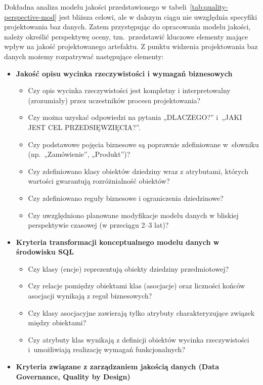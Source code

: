 Dokładna analiza modelu jakości przedstawionego w tabeli~\ref{tab:quality-perspective-mod} jest bliższa celowi, ale w dalszym ciągu nie uwzględnia specyfiki projektowania baz danych. Zatem przystępując do opracowania modelu jakości, należy określić perspektywę oceny, tzn.\ przedstawić kluczowe elementy mające wpływ na jakość projektowanego artefaktu. Z punktu widzenia projektowania baz danych możemy rozpatrywać następujące elementy:

\begin{itemize}
  \item \textbf{Jakość opisu wycinka rzeczywistości i wymagań biznesowych}
  \begin{itemize}
    \item Czy opis wycinka rzeczywistości jest kompletny i interpretowalny (zrozumiały) przez uczestników procesu projektowania?
    \item Czy można uzyskać odpowiedzi na pytania „DLACZEGO?” i~„JAKI JEST CEL PRZEDSIĘWZIĘCIA?”.
    \item Czy podstawowe pojęcia biznesowe są poprawnie zdefiniowane w~słowniku (np.\ „Zamówienie”, „Produkt”)?
    \item Czy zdefiniowano klasy obiektów dziedziny wraz z atrybutami, których wartości gwarantują rozróżnialność obiektów?
    \item Czy zdefiniowano reguły biznesowe i ograniczenia dziedzinowe?
    \item Czy uwzględniono planowane modyfikacje modelu danych w bliskiej perspektywie czasowej (w przeciągu 2--3 lat)?
  \end{itemize}
  \item \textbf{Kryteria transformacji konceptualnego modelu danych w środowisku SQL}
  \begin{itemize}
    \item Czy klasy (encje) reprezentują obiekty dziedziny przedmiotowej?
    \item Czy relacje pomiędzy obiektami klas (asocjacje) oraz liczności końców asocjacji wynikają z reguł biznesowych?
    \item Czy klasy asocjacyjne zawierają tylko atrybuty charakteryzujące związek między obiektami?
    \item Czy atrybuty klas wynikają z definicji obiektów wycinka rzeczywistości i~umożliwiają realizację wymagań funkcjonalnych?
  \end{itemize}
  \item \textbf{Kryteria związane z zarządzaniem jakością danych (Data Governance, Quality by Design)}

\end{itemize}
